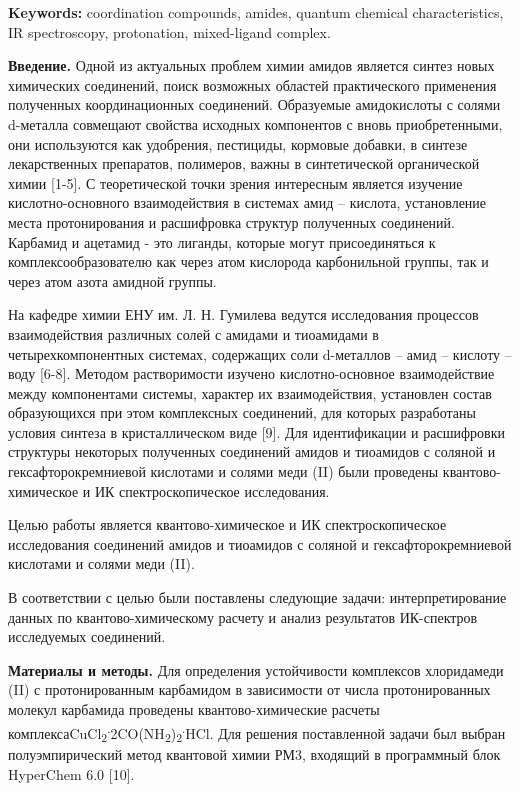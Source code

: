 {\bfseries Keywords:} coordination compounds, amides, quantum chemical
characteristics, IR spectroscopy, protonation, mixed-ligand complex.

{\bfseries Введение.} Одной из актуальных проблем химии амидов является
синтез новых химических соединений, поиск возможных областей
практического применения полученных координационных соединений.
Образуемые амидокислоты с солями d-металла совмещают свойства исходных
компонентов с вновь приобретенными, они используются как удобрения,
пестициды, кормовые добавки, в синтезе лекарственных препаратов,
полимеров, важны в синтетической органической химии {[}1-5{]}. С
теоретической точки зрения интересным является изучение
кислотно-основного взаимодействия в системах амид -- кислота,
установление места протонирования и расшифровка структур полученных
соединений. Карбамид и ацетамид - это лиганды, которые могут
присоединяться к комплексообразователю как через атом кислорода
карбонильной группы, так и через атом азота амидной группы.

На кафедре химии ЕНУ им. Л. Н. Гумилева ведутся исследования процессов
взаимодействия различных солей с амидами и тиоамидами в
четырехкомпонентных системах, содержащих соли d-металлов -- амид --
кислоту -- воду {[}6-8{]}. Методом растворимости изучено
кислотно-основное взаимодействие между компонентами системы, характер их
взаимодействия, установлен состав образующихся при этом комплексных
соединений, для которых разработаны условия синтеза в кристаллическом
виде {[}9{]}. Для идентификации и расшифровки структуры некоторых
полученных соединений амидов и тиоамидов с соляной и
гексафторокремниевой кислотами и солями меди (II) были проведены
квантово-химическое и ИК спектроскопическое исследования.

Целью работы является квантово-химическое и ИК спектроскопическое
исследования соединений амидов и тиоамидов с соляной и
гексафторокремниевой кислотами и солями меди (II).

В соответствии с целью были поставлены следующие задачи:
интерпретирование данных по квантово-химическому расчету и анализ
результатов ИК-спектров исследуемых соединений.

{\bfseries Материалы и методы.} Для определения устойчивости комплексов
хлоридамеди (II) с протонированным карбамидом в зависимости от числа
протонированных молекул карбамида проведены квантово-химические расчеты
комплексаCuCl\textsubscript{2}\textsuperscript{.}2CO(NH\textsubscript{2})\textsubscript{2}\textsuperscript{.}HCl.
Для решения поставленной задачи был выбран полуэмпирический метод
квантовой химии РМ3, входящий в программный блок HyperChem 6.0 {[}10{]}.

